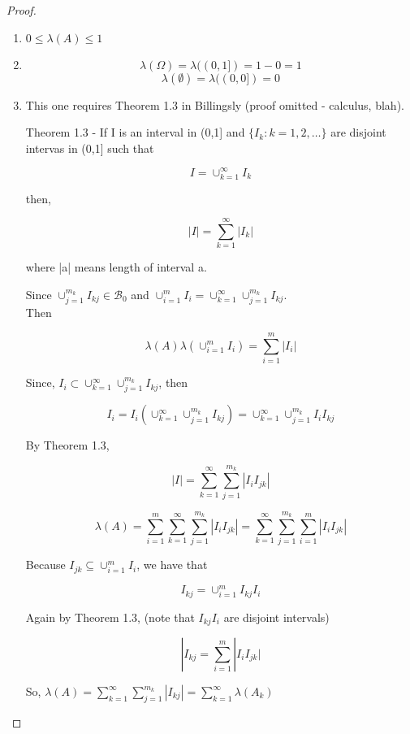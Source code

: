 \documentclass[11pt,fleqn]{book} %
\begin{document}
\begin{proof}
	\begin{enumerate}
		\item $0 \leq \lambda(A) \leq 1$

		\item $$\lambda(\Omega) = \lambda((0,1]) = 1-0 = 1$$
		$$\lambda(\emptyset) = \lambda((0,0]) = 0$$


		\item This one requires Theorem 1.3 in Billingsly (proof omitted - calculus, blah).

		Theorem 1.3 - If I is an interval in (0,1] and $\{I_k: k=1, 2, \dots \}$ are disjoint intervas in (0,1] such that 

		$$I = \cup^\infty_{k=1} I_k$$

		then, 

		$$|I| = \displaystyle \sum^\infty_{k=1} |I_k| $$

		where |a| means length of interval a. 

		Since $\cup^{m_k}_{j=1} I_{kj} \in \mathscr{B}_0$ and $\cup^{m}_{i=1} I_{i} = \cup^\infty_{k=1}\cup^{m_k}_{j=1} I_{kj}$.\\

		Then 

		$$\lambda(A) \lambda(\cup^{m}_{i=1} I_{i}) = \displaystyle \sum^m_{i=1} |I_i| $$

		Since, $I_i \subset \cup^\infty_{k=1}\cup^{m_k}_{j=1} I_{kj}$, then 

		$$I_i = I_i(\cup^\infty_{k=1}\cup^{m_k}_{j=1} I_{kj}) = \cup^\infty_{k=1}\cup^{m_k}_{j=1} I_i I_{kj} $$

		By Theorem 1.3, 

		$$|I| = \displaystyle \sum^\infty_{k=1} \sum^{m_k}_{j=1} |I_i I_{jk}| $$

		$$\lambda(A) = \displaystyle \sum^m_{i=1} \sum^\infty_{k=1} \sum^{m_k}_{j=1} |I_i I_{jk}| = \displaystyle  \sum^\infty_{k=1} \sum^{m_k}_{j=1} \sum^m_{i=1}|I_i I_{jk}| $$

		Because $I_{jk} \subseteq \cup^m_{i=1} I_i$, we have that

		$$I_{kj} = \cup^m_{i=1} I_{kj} I_i $$

		Again by Theorem 1.3, (note that $I_{kj} I_i$ are disjoint intervals)

		$$|I_{kj} = \sum^m_{i=1}|I_i I_{jk}| $$

		So, $\lambda(A) = \sum^\infty_{k=1} \sum^{m_k}_{j=1} | I_{kj} | = \sum^\infty_{k=1} \lambda(A_k)$


	\end{enumerate}


\end{proof}
\end{document}
